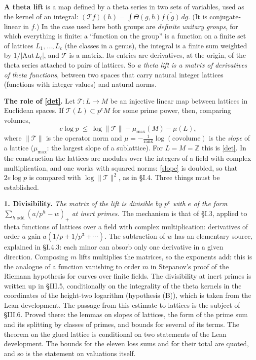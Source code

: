 \documentclass[11pt,letterpaper]{article}
\newcommand{\Z}{\mathbb Z}\newcommand{\Q}{\mathbb Q}\newcommand{\C}{\mathbb C}
\begin{document}
\textbf{A theta lift} is a map defined by a theta series in two sets of variables, used as the kernel
of an integral: $(\mathcal Tf)(h)=\int\Theta(g,h)\overline{f(g)}\,dg$. (It is conjugate-linear in $f$.) In the case used here both groups are
\emph{definite unitary groups}, for which everything is finite: a ``function on the group'' is a function on
a finite set of lattices $L_1,\dots,L_c$ (the classes in a genus), the integral is a finite sum weighted by
$1/|\mathrm{Aut}\,L_i|$, and $\mathcal T$ is a matrix. Its entries are derivatives, at the origin, of the
theta series attached to pairs of lattices. So \emph{a theta lift is a matrix of derivatives of theta
functions}, between two spaces that carry natural integer lattices (functions with integer values) and
natural norms.

\textbf{The role of \eqref{det}.} Let $\mathcal T:L\to M$ be an injective linear map between lattices in
Euclidean spaces. If $\mathcal T(L)\subset p^eM$ for some prime power, then, comparing volumes,
\begin{equation}\label{slope}
 e\log p\ \le\ \log\|\mathcal T\|+\mu_{\max}(M)-\mu(L),
\end{equation}
where $\|\mathcal T\|$ is the operator norm and $\mu=-\frac1{\mathrm{rank}}\log(\text{covolume})$ is the
\emph{slope} of a lattice ($\mu_{\max}$: the largest slope of a sublattice). For $L=M=\Z$ this is
\eqref{det}. In the construction the lattices are modules over the integers of a field with complex
multiplication, and one works with squared norms: \eqref{slope} is doubled, so that $2e\log p$ is compared
with $\log\|\mathcal T\|^2$, as in \S I.4. Three things must be established.

\textbf{1. Divisibility.} \emph{The matrix of the lift is divisible by $p^{e}$ with $e$ of the form
$\sum_{h\text{ odd}}(a/p^h-w)_+$ at inert primes.} The mechanism is that of \S I.3, applied to theta functions of lattices over a field with complex
multiplication: derivatives of order $a$ gain $a(1/p+1/p^3+\cdots)$. The subtraction of $w$ has an elementary source, explained in \S I.4.3:
each minor can absorb only one derivative in a given direction. Composing $m$ lifts multiplies the matrices, so
the exponents add: this is the analogue of a function vanishing to order $m$ in Stepanov's proof of the
Riemann hypothesis for curves over finite fields. The divisibility at inert primes is written up in \S III.5, conditionally on the integrality of the theta kernels in the coordinates of the height-two logarithm (hypothesis (B)), which is taken from the Lean development. The passage from this estimate to lattices is the subject of \S III.6. Proved there: the lemmas on slopes of lattices, the form of the prime sum and its splitting by classes of primes, and bounds for several of its terms. The theorem on the glued lattice is conditional on two statements of the Lean development. The bounds for the eleven loss sums and for their total are quoted, and so is the statement on valuations itself.
\end{document}

